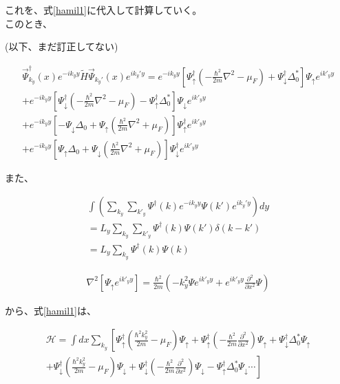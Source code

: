 \documentclass{jsarticle}
\begin{document}
		これを、式\eqref{hamil1}に代入して計算していく。　\\
		このとき、

		(以下、まだ訂正してない)


		\begin{align}
			\vec{\Psi}_{k_y}^\dagger(x) e^{-ik_yy} \tilde{H}  \vec{\Psi}_{k_y'}(x) e^{ik_y'y} =
			e^{-ik_yy} \left[ \Psi_\uparrow^\dagger \left( -\frac{\hbar^2}{2m}\nabla^2-\mu_F \right) +\Psi_\downarrow^\dagger \Delta_0^\ast \right] \Psi_\uparrow e^{ik'_yy} \nonumber\\
			+e^{-ik_yy} \left[ \Psi_\downarrow^\dagger \left( -\frac{\hbar^2}{2m}\nabla^2-\mu_F \right) -\Psi_\uparrow^\dagger \Delta_0^\ast \right] \Psi_\downarrow e^{ik'_yy} \nonumber\\
			+ e^{-ik_yy} \left[ -\Psi_\downarrow\Delta_0 +\Psi_\uparrow \left( \frac{\hbar^2}{2m}\nabla^2+\mu_F \right) \right] \Psi_\uparrow^\dagger e^{ik'_yy} \nonumber\\
			+e^{-ik_yy} \left[ \Psi_\uparrow\Delta_0 +\Psi_\downarrow \left( \frac{\hbar^2}{2m}\nabla^2+\mu_F \right) \right] \Psi_\downarrow^\dagger e^{ik'_yy}
		\end{align}

		また、

		\begin{align}
		\int \left( \sum_{k_y}\sum_{k'_y}\Psi^\dagger(k) e^{-ik_yy}\Psi(k')e^{ik_y'y} \right) dy \nonumber \\
		=L_y\sum_{k_y}\sum_{k'_y}\Psi^\dagger(k) \Psi(k')\delta \left( k-k' \right) \nonumber \\
		=L_y\sum_{k_y}\Psi^\dagger(k)\Psi(k)
		\end{align}

		\begin{align}
			\nabla^2 \left[ \Psi_\uparrow e^{ik'_yy} \right]=
			\frac{\hbar^2}{2m}
			\left( -k_y^2\Psi e^{ik'_yy} + e^{ik'_yy}\frac{\partial^2}{\partial x^2}\Psi \right)
		\end{align}


		から、式\eqref{hamil1}は、

		\begin{align}
			\mathcal{H}=\int dx \sum_{k_y}
			\left[ \Psi_\uparrow^\dagger \left( \frac{\hbar^2k_y^2}{2m}-\mu_F \right)\Psi_\uparrow
			+\Psi_\uparrow^\dagger \left(- \frac{\hbar^2}{2m}\frac{\partial^2}{\partial x^2}\right)\Psi_\uparrow
			+\Psi_\downarrow^\dagger \Delta_0^\ast \Psi_\uparrow \right. \nonumber \\ \left.+
			\Psi_\downarrow^\dagger \left( \frac{\hbar^2k_y^2}{2m}-\mu_F \right)\Psi_\downarrow
			+\Psi_\downarrow^\dagger \left(- \frac{\hbar^2}{2m}\frac{\partial^2}{\partial x^2} \right) \Psi_\downarrow
			-\Psi_\uparrow^\dagger \Delta_0^\ast \Psi_\downarrow \cdots
			\right]
			\label{hamil2}
		\end{align}
\end{document}
